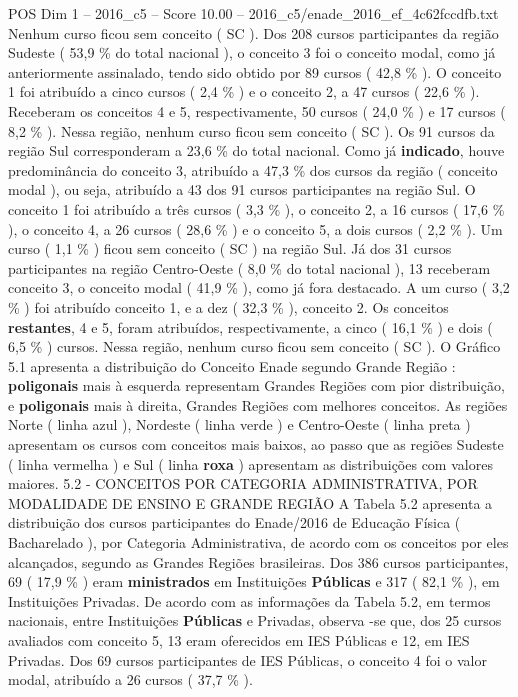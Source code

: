 \begin{textsample}{POS Dim 1 – 2016\_c5 – Score 10.00 – 2016\_c5/enade\_2016\_ef\_4c62fccdfb.txt}
Nenhum curso ficou sem conceito ( SC ).
Dos 208 cursos participantes da região Sudeste ( 53,9 \% do total nacional ), o conceito 3 foi o conceito modal, como já anteriormente assinalado, tendo sido obtido por 89 cursos ( 42,8 \% ).
O conceito 1 foi atribuído a cinco cursos ( 2,4 \% ) e o conceito 2, a 47 cursos ( 22,6 \% ).
Receberam os conceitos 4 e 5, respectivamente, 50 cursos ( 24,0 \% ) e 17 cursos ( 8,2 \% ).
Nessa região, nenhum curso ficou sem conceito ( SC ).
Os 91 cursos da região Sul corresponderam a 23,6 \% do total nacional.
Como já \textbf{indicado}, houve predominância do conceito 3, atribuído a 47,3 \% dos cursos da região ( conceito modal ), ou seja, atribuído a 43 dos 91 cursos participantes na região Sul.
O conceito 1 foi atribuído a três cursos ( 3,3 \% ), o conceito 2, a 16 cursos ( 17,6 \% ), o conceito 4, a 26 cursos ( 28,6 \% ) e o conceito 5, a dois cursos ( 2,2 \% ).
Um curso ( 1,1 \% ) ficou sem conceito ( SC ) na região Sul.
Já dos 31 cursos participantes na região Centro-Oeste ( 8,0 \% do total nacional ), 13 receberam conceito 3, o conceito modal ( 41,9 \% ), como já fora destacado.
A um curso ( 3,2 \% ) foi atribuído conceito 1, e a dez ( 32,3 \% ), conceito 2.
Os conceitos \textbf{restantes}, 4 e 5, foram atribuídos, respectivamente, a cinco ( 16,1 \% ) e dois ( 6,5 \% ) cursos.
Nessa região, nenhum curso ficou sem conceito ( SC ).
O Gráfico 5.1 apresenta a distribuição do Conceito Enade segundo Grande Região : \textbf{poligonais} mais à esquerda representam Grandes Regiões com pior distribuição, e \textbf{poligonais} mais à direita, Grandes Regiões com melhores conceitos.
As regiões Norte ( linha azul ), Nordeste ( linha verde ) e Centro-Oeste ( linha preta ) apresentam os cursos com conceitos mais baixos, ao passo que as regiões Sudeste ( linha vermelha ) e Sul ( linha \textbf{roxa} ) apresentam as distribuições com valores maiores. 5.2 - CONCEITOS POR CATEGORIA ADMINISTRATIVA, POR MODALIDADE DE ENSINO E GRANDE REGIÃO A Tabela 5.2 apresenta a distribuição dos cursos participantes do Enade/2016 de Educação Física ( Bacharelado ), por Categoria Administrativa, de acordo com os conceitos por eles alcançados, segundo as Grandes Regiões brasileiras.
Dos 386 cursos participantes, 69 ( 17,9 \% ) eram \textbf{ministrados} em Instituições \textbf{Públicas} e 317 ( 82,1 \% ), em Instituições Privadas.
De acordo com as informações da Tabela 5.2, em termos nacionais, entre Instituições \textbf{Públicas} e Privadas, observa -se que, dos 25 cursos avaliados com conceito 5, 13 eram oferecidos em IES Públicas e 12, em IES Privadas.
Dos 69 cursos participantes de IES Públicas, o conceito 4 foi o valor modal, atribuído a 26 cursos ( 37,7 \% ).

\end{textsample}
